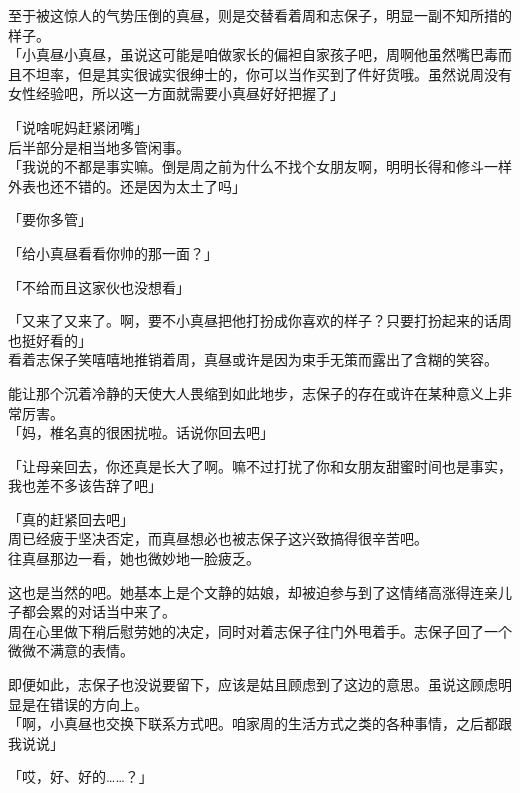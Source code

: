 至于被这惊人的气势压倒的真昼，则是交替看着周和志保子，明显一副不知所措的样子。\\

「小真昼小真昼，虽说这可能是咱做家长的偏袒自家孩子吧，周啊他虽然嘴巴毒而且不坦率，但是其实很诚实很绅士的，你可以当作买到了件好货哦。虽然说周没有女性经验吧，所以这一方面就需要小真昼好好把握了」

「说啥呢妈赶紧闭嘴」\\

后半部分是相当地多管闲事。\\

「我说的不都是事实嘛。倒是周之前为什么不找个女朋友啊，明明长得和修斗一样外表也还不错的。还是因为太土了吗」

「要你多管」

「给小真昼看看你帅的那一面？」

「不给而且这家伙也没想看」

「又来了又来了。啊，要不小真昼把他打扮成你喜欢的样子？只要打扮起来的话周也挺好看的」\\

看着志保子笑嘻嘻地推销着周，真昼或许是因为束手无策而露出了含糊的笑容。

能让那个沉着冷静的天使大人畏缩到如此地步，志保子的存在或许在某种意义上非常厉害。\\

「妈，椎名真的很困扰啦。话说你回去吧」

「让母亲回去，你还真是长大了啊。嘛不过打扰了你和女朋友甜蜜时间也是事实，我也差不多该告辞了吧」

「真的赶紧回去吧」\\

周已经疲于坚决否定，而真昼想必也被志保子这兴致搞得很辛苦吧。\\

往真昼那边一看，她也微妙地一脸疲乏。

这也是当然的吧。她基本上是个文静的姑娘，却被迫参与到了这情绪高涨得连亲儿子都会累的对话当中来了。\\

周在心里做下稍后慰劳她的决定，同时对着志保子往门外甩着手。志保子回了一个微微不满意的表情。

即便如此，志保子也没说要留下，应该是姑且顾虑到了这边的意思。虽说这顾虑明显是在错误的方向上。\\

「啊，小真昼也交换下联系方式吧。咱家周的生活方式之类的各种事情，之后都跟我说说」

「哎，好、好的……？」\\

